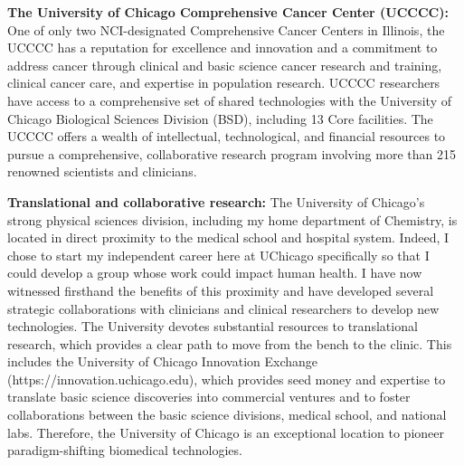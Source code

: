 \documentclass[onecolumn, compsoc,12pt]{IEEEtran}
\begin{document}
\textbf{The University of Chicago Comprehensive Cancer Center (UCCCC):} One of only two NCI-designated Comprehensive Cancer Centers in Illinois, the UCCCC has a reputation for excellence and innovation and a commitment to address cancer through clinical and basic science cancer research and training, clinical cancer care, and expertise in population research. UCCCC researchers have access to a comprehensive set of shared technologies with the University of Chicago Biological Sciences Division (BSD), including 13 Core facilities. The UCCCC offers a wealth of intellectual, technological, and financial resources to pursue a comprehensive, collaborative research program involving more than 215 renowned scientists and clinicians.

\textbf{Translational and collaborative research:} The University of Chicago's strong physical sciences division, including my home department of Chemistry, is located in direct proximity to the medical school and hospital system. Indeed, I chose to start my independent career here at UChicago specifically so that I could develop a group whose work could impact human health. I have now witnessed firsthand the benefits of this proximity and have developed several strategic collaborations with clinicians and clinical researchers to develop new technologies. The University devotes substantial resources to translational research, which provides a clear path to move from the bench to the clinic. This includes the University of Chicago Innovation Exchange (https://innovation.uchicago.edu), which provides seed money and expertise to translate basic science discoveries into commercial ventures and to foster collaborations between the basic science divisions, medical school, and national labs. Therefore, the University of Chicago is an exceptional location to pioneer paradigm-shifting biomedical technologies.
\end{document}
